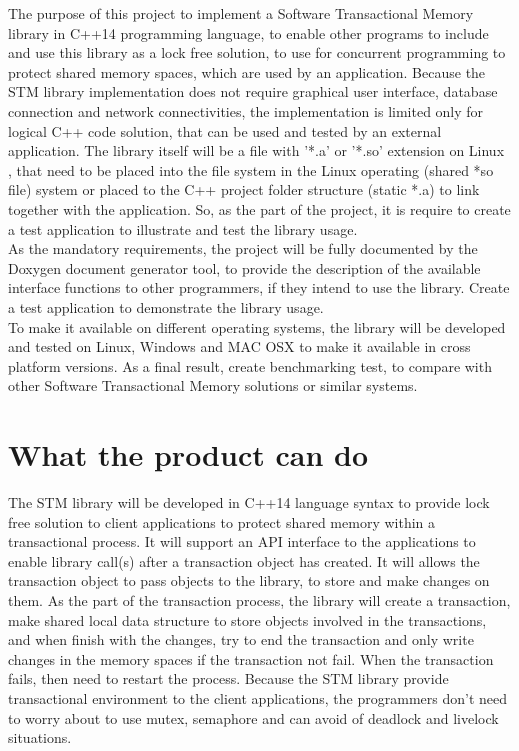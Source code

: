 \documentclass[12pt]{article}
\begin{document}
The purpose of this project to implement a Software Transactional Memory library in C++14 programming language, to enable other programs to include and use this library as a lock free solution, to use for concurrent programming to protect shared memory spaces, which are used by an application. Because the STM library implementation does not require graphical user interface, database connection and network connectivities, the implementation is limited only for logical C++ code solution, that can be used and tested by an external application. The library itself will be a file with '*.a' or '*.so' extension on Linux , that need to be placed into the file system in the Linux operating (shared *so file) system or placed to the C++ project folder structure (static *.a) to link together with the application. So, as the part of the project, it is require to create a test application to illustrate and test the library usage.\\

As the mandatory requirements, the project will be fully documented by the Doxygen document generator tool, to provide the description of the available interface functions to other programmers, if they intend to use the library. Create a test application to demonstrate the library usage.\\

To make it available on different operating systems, the library will be developed and tested on Linux, Windows and MAC OSX to make it available in cross platform versions. As a final result, create benchmarking test, to compare with other Software Transactional Memory solutions or similar systems.

\clearpage
\section{What the product can do}
The STM library will be developed in C++14 language syntax to provide lock free solution to client applications to protect shared memory within a transactional process. It will support an API interface to the applications to enable library call(s) after a transaction object has created. It will allows the transaction object to pass objects to the library, to store and make changes on them. As the part of the transaction process, the library will create a transaction, make shared local data structure to store objects involved in the transactions, and when finish with the changes, try to end the transaction and only write changes in the memory spaces if the transaction not fail. When the transaction fails, then need to restart the process. Because the STM library provide transactional environment to the client applications, the programmers don't need to worry about to use mutex, semaphore and can avoid of deadlock and livelock situations.
\end{document}
